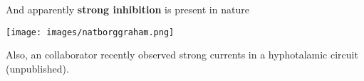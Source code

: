 \usualsep\usualsep\usualsep
\begin{center}
   And apparently {\bf \color{blue} strong inhibition} is present in nature
\end{center}

\usualsep\usualsep
\begin{minipage}{0.28\textwidth}
  \texttt{[image: images/natborggraham.png]}
\end{minipage}
\begin{minipage}{0.22\textwidth}
  \begin{center}
    
    
    \usualsep
    
    \usualsep    
    
    \usualsep\usualsep 
    
     Also, an collaborator recently observed strong
    currents in a hyphotalamic circuit (unpublished).
    
  \end{center}
  
\end{minipage}


\usualsep\usualsep\usualsep\usualsep\usualsep\usualsep\usualsep\usualsep\usualsep
\phantom{Breu!}
